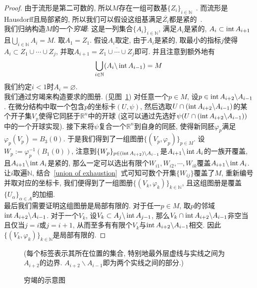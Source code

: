 \begin{proof}
    由于流形是第二可数的, 所以$M$存在一组可数基$\{Z_i\}_{i\in\mathbb{N}}$~\parencite[定理2.50]{Lee_IntroTopoMani}.
    而流形是Hausdorff且局部紧的, 所以我们可以假设这组基满足$\overline{Z_i}$都是紧的~\parencite[命题4.63]{Lee_IntroTopoMani}.\\
    我们归纳构造$M$的一个\textit{穷竭}: 这是一列集合$\{A_i\}_{i\in\mathbb{N}}$, 满足$A_i$是紧的, $A_i\subset\operatorname{int} A_{i+1}$且$\displaystyle\bigcup_{i\in\mathbb{N}}A_i=M$.
    取$A_1=Z_1$. 假设$A_i$取定, 由于$A_i$是紧的, 取最小的指标$j$使得$A_i\subset Z_1\cup\cdots\cup Z_j$, 并取$A_{i+1}=\overline{Z_1\cup\cdots\cup Z_j}$即可.
    并且注意到额外地有
    \begin{equation}
        \bigcup_{i\in\mathbb{N}}(A_{i}\backslash\operatorname{int}{A_{i-1}})=M\label{union of exhaustion}
    \end{equation}
    我们约定$i<1$时$A_i=\varnothing$.\\
    我们通过穷竭来构造要求的图册. (见图~\ref{figure of exhaustion})
    对任意一个$p\in M$, 设$p\in\operatorname{int} A_{i+2}\backslash A_{i-1}$.
    在微分结构中取一个包含$p$的坐标卡$(U,\psi)$, 然后选取$U\cap(\operatorname{int} A_{i+2}\backslash A_{i-1})$的某个开子集$V_p$使得它同胚于$\mathbb{R}^n$中的开球 (这可以通过先选好$\psi(U\cap(\operatorname{int} A_{i+2}\backslash A_{i-1}))$中的一个开球实现).
    接下来将$\psi$复合一个$\mathbb{R}^n$到自身的同胚, 使得新同胚$\varphi_p$满足$\varphi_p(V_p)=B_3(0)$.
    于是我们得到了一组图册$\{(V_p,\varphi_p)\}_{p\in M}$.
    设$W_p:=\varphi^{-1}_p(B_1(0))$, 注意到$\{W_p\}_{p\in(\operatorname{int} A_{i+2})\backslash A_{i-1}}$是$A_{i+1}\backslash\operatorname{int}{A_i}$的一族开覆盖, 且$A_{i+1}\backslash\operatorname{int}{A_i}$是紧的, 那么一定可以选出有限个$W_{i1},W_{i2},\cdots,W_{ik}$覆盖$A_{i+1}\backslash\operatorname{int}{A_i}$.
    让$i$取遍$\mathbb{N}$, 结合~\eqref{union of exhaustion}~式可知可数个开集$\{W_{ij}\}$覆盖了$M$, 重新编号并取对应的坐标卡, 我们便得到了一组图册$\{(V_k,\varphi_k)\}_{k\in\mathbb{N}}$, 且这组图册是覆盖$\{U_\alpha\}_{\alpha\in A}$的加细.\\
    最后我们需要证明这组图册是局部有限的.
    对于任一$p\in M$, 取$p$的邻域$\operatorname{int} A_{i+2}\backslash A_{i-1}$.
    对于一个$V_k$, 设$V_k\subset A_j\backslash\operatorname{int}{A_{j-1}}$, 那么$V_k\cap\operatorname{int} A_{i+2}\backslash A_{i-1}$非空当且仅当$j=i$或$j=i+1$, 从而至多有有限个$V_k$与$\operatorname{int} A_{i+2}\backslash A_{i-1}$相交.
    因此$\{(V_k,\varphi_k)\}_{k\in\mathbb{N}}$是局部有限的.
\end{proof}

\begin{figure}[ht]
    \centering\label{figure of exhaustion}
    
    \caption{穷竭的示意图}
    (每个标签表示其所在位置的集合, 特别地最外层虚线与实线之间为$A_{i+2}$的边界. $A_{i+2}\backslash A_{i-1}$即为两个实线之间的部分.)
\end{figure}

